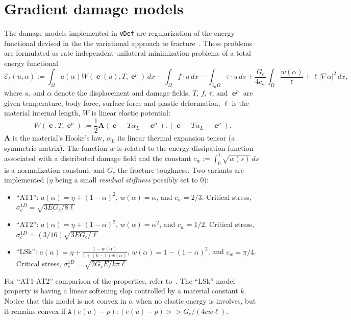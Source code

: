 \documentclass[10pt,oneside]{memoir}
\def\vDef{{\texttt{vDef}} }
\DeclareMathOperator{\e}{{\mathbf e}}
\begin{document}
\section{Gradient damage models}
\label{sec:GradientDamageModels}
The damage models implemented in \vDef are regularization of the energy functional devised in the the variational approach to fracture~\cite{Ambrosio-Tortorelli-1990,Ambrosio-Tortorelli-1992,Giacomini-2005,Sicsic-Marigo-2013a}. These problems are formulated as rate independent unilateral minimization problems of a total energy functional
\begin{equation}
	\label{eq:defEll}
	\mathcal{E}_\ell(u,\alpha) := \int_\Omega a(\alpha) W(\e(u),T,\e^p)\, dx - \int_\Omega f\cdot u \, dx - \int_{\partial_n \Omega} \tau \cdot u \, ds + \frac{G_c}{4c_w} \int_\Omega \frac{w(\alpha)}{\ell} + \ell|\nabla \alpha|^2\, dx,
\end{equation}
where $u$, and $\alpha$ denote the displacement and damage fields, $T$, $f$, $\tau$, and $\e^p$ are given temperature, body force, surface force and plastic deformation, $\ell$ is the material internal length, $W$ is linear elastic potential:
$$
W(\e,T,\e^p) := \frac{1}{2} \mathbf{A}\left(\e-T \alpha_L-\e^p\right):\left(\e-T \alpha_L-\e^p\right).
$$
$\mathbf{A}$ is the material's Hooke's law, $\alpha_L$ its linear thermal expansion tensor (a symmetric matrix).
The function $w$ is related to the energy dissipation function associated with a distributed damage field and the constant $c_w:= \int_0^1 \sqrt{w(s)}\, ds$ is a normalization constant, and $G_c$ the fracture toughness.
Two variants are implemented ($\eta$ being a small \emph{residual stiffness} possibly set to 0):
\begin{itemize}
\item ``AT1'': $a(\alpha) = \eta + (1-\alpha)^2$, $w(\alpha) = \alpha$, and $c_w =2/3$. Critical stress, $\sigma_c^{1D} = \sqrt{3EG_c/8\ell}$
\item ``AT2'': $a(\alpha) = \eta + (1-\alpha)^2$, $w(\alpha) = \alpha^2$, and $c_w = 1/2$. Critical stress,  $\sigma_c^{1D} = (3/16) \sqrt{3EG_c/\ell}$
\item ``LSk'': $a(\alpha) =  \eta + \frac{1-w(\alpha)}{1+(k-1)w(\alpha)}$, $w(\alpha) = 1- (1-\alpha)^2$, and $c_w =\pi/4$.  Critical stress, $\sigma_c^{1D} = \sqrt{2G_cE/k\pi\ell}$
\end{itemize}
For ``AT1-AT2'' comparison of the properties, refer to~\cite{Pham-Amor-EtAl-2011a}. The ``LSk'' model property is having a linear softening slop controlled by a material constant $k$. Notice that this model is not convex in $\alpha$ when no elastic energy is involves, but it remains convex if $\mathtt{A}(e(u)-p):(e(u)-p) >> G_c/(4cw\ell)$.
\end{document}
